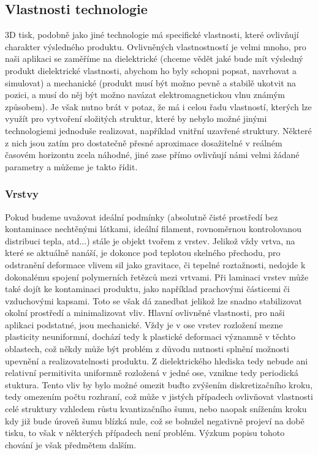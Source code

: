 \subsection{Vlastnosti technologie}
3D tisk, podobně jako jiné technologie má specifické vlastnosti, které ovlivňují charakter výsledného produktu. Ovlivněných vlastnostností je velmi mnoho, pro naši aplikaci se zaměříme na dielektrické (chceme vědět jaké bude mít výsledný produkt dielektrické vlastnosti, abychom ho byly schopni popsat, navrhovat a simulovat) a mechanické (produkt musí být možno pevně a stabilě ukotvit na pozici, a musí do něj být možno navázat elektromagnetickou vlnu známým způsobem). Je však nutno brát v potaz, že má i celou řadu vlastností, kterých lze využít pro vytvoření složitých struktur, které by nebylo možné jinými technologiemi jednoduše realizovat, například vnitřní uzavřené struktury. Některé z nich jsou zatím pro dostatečně přesné aproximace dosažitelné v reálném časovém horizontu zcela náhodné, jiné zase přímo ovlivňují námi velmi žádané parametry a můžeme je takto řídit.

\subsubsection{Vrstvy}
Pokud budeme uvažovat ideální podmínky (absolutně čisté prostředí bez kontaminace nechtěnými látkami, ideální filament, rovnoměrnou kontrolovanou distribuci tepla, atd...) stále je objekt tvořem z vrstev. Jelikož vždy vrtva, na které se aktuálně nanáší, je dokonce pod teplotou skelného přechodu, pro odstranění deformace vlivem sil jako gravitace, či tepelné roztažnosti, nedojde k dokonalému spojení polymerních řetězců mezi vrtvami. Při laminaci vrstev může také dojít ke kontaminaci produktu, jako například prachovými částicemi či vzduchovými kapsami. Toto se však dá zanedbat jelikož lze snadno stabilizovat okolní prostředí a minimalizovat vliv. 
Hlavní ovlivněné vlastnosti, pro naši aplikaci podstatné, jsou mechanické. Vždy je v ose vrstev rozložení mezne plasticity neuniformní, dochází tedy k plastické deformaci významně v těchto oblastech, což někdy může být problém z důvodu nutnosti splnění možnosti upevnění a realizovatelnosti produktu.
Z dielektrického hlediska tedy nebude ani relativní permitivita uniformně rozložená v jedné ose, vznikne tedy periodická stuktura. Tento vliv by bylo možné omezit buďto zvýšením diskretizačního kroku, tedy omezením počtu rozhraní, což může v jistých případech ovlivňovat vlastnosti celé struktury vzhledem růstu kvantizačního šumu, nebo naopak snížením kroku kdy již bude úroveň šumu blízká nule, což se bohužel negativně projeví na době tisku, to však v některých případech není problém. Výzkum popisu tohoto chování je však předmětem dalším.

